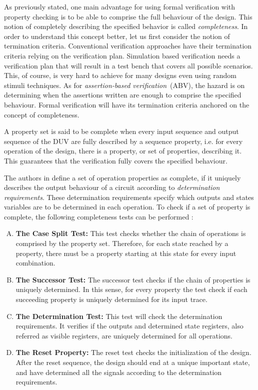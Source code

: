 As previously stated, one main advantage for using formal verification with property checking is to be able to comprise the full behaviour of the design. This notion of completely describing the specified behavior is called \textit{completeness}. In order to understand this concept better, let us first consider the notion of termination criteria. Conventional verification approaches have their termination criteria relying on the verification plan. Simulation based verification needs a verification plan that will result in a test bench that covers all possible scenarios. This, of course, is very hard to achieve for many designs even using random stimuli techniques. As for \textit{assertion-based verification}~(ABV), the hazard is on determining when the assertions written are enough to comprise the specified behaviour. Formal verification will have its termination criteria anchored on the concept of completeness.

A property set is said to be complete when every input sequence and output sequence of the DUV are fully described by a sequence property, i.e. for every operation of the design, there is a property, or set of properties, describing it. This guarantees that the verification fully covers the specified behaviour.

The authors in \cite{paper-gapfree} define a set of operation properties as complete, if it uniquely describes the output behaviour of a circuit according to \textit{determination requirements}. These determination requirements specify which outputs and states variables are to be determined in each operation. To check if a set of property is complete, the following completeness tests can be performed \cite{guide-onespin}:

\begin{enumerate}[A.]
    \item \textbf{The Case Split Test:} This test checks whether the chain of operations is comprised by the property set. Therefore, for each state reached by a property, there must be a property starting at this state for every input combination.
    \item \textbf{The Successor Test:} The successor test checks if the chain of properties is uniquely determined. In this sense, for every property the test check if each succeeding property is uniquely determined for its input trace.
    \item \textbf{The Determination Test:} This test will check the determination requirements. It verifies if the outputs and determined state registers, also referred as visible registers, are uniquely determined for all operations.
    \item \textbf{The Reset Property:} The reset test checks the initialization of the design. After the reset sequence, the design should end at a unique important state, and have determined all the signals according to the determination requirements.
\end{enumerate}


